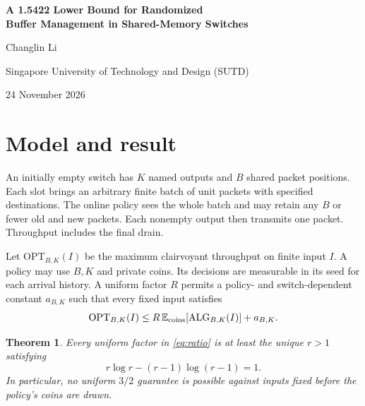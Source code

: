 \documentclass[11pt,letterpaper]{article}
\newtheorem{theorem}{Theorem}
\newcommand{\OPT}{\mathrm{OPT}}
\newcommand{\E}{\mathbb{E}}
\newcommand{\ALG}{\mathrm{ALG}}
\begin{document}
\begin{center}
{\LARGE\bfseries A 1.5422 Lower Bound for Randomized\\[3pt] Buffer Management in Shared-Memory Switches}\par
\vspace{0.6em}
{\large Changlin Li}\par
{\small Singapore University of Technology and Design (SUTD)}\par
{\small 24 November 2026}
\end{center}

\begin{abstract}
A shared-memory switch transmits one unit packet from each nonempty output queue per slot. We prove that every causal admission and eviction policy has uniform competitive ratio at least $1.5422114197\ldots$, even with private randomization against an oblivious adversary. The bound is the unique root $r>1$ of $r\log r-(r-1)\log(r-1)=1$. All queues start receiving together. A hidden permutation assigns their last arrival times. A capacity inequality accounts for the stock in queues about to stop receiving and in those already draining. Geometrically spaced groups approach the bound, and one explicit finite switch forces a ratio above $3/2$.
\end{abstract}

\section{Model and result}
An initially empty switch has $K$ named outputs and $B$ shared packet positions. Each slot brings an arbitrary finite batch of unit packets with specified destinations. The online policy sees the whole batch and may retain any $B$ or fewer old and new packets. Each nonempty output then transmits one packet. Throughput includes the final drain.

Let $\OPT_{B,K}(I)$ be the maximum clairvoyant throughput on finite input $I$. A policy may use $B,K$ and private coins. Its decisions are measurable in its seed for each arrival history. A uniform factor $R$ permits a policy- and switch-dependent constant $a_{B,K}$ such that every fixed input satisfies
\begin{equation}
  \OPT_{B,K}(I)\le R\,\E_{\rm coins}[\ALG_{B,K}(I)]+a_{B,K}.\label{eq:ratio}
\end{equation}
\begin{theorem}\label{thm:main}
Every uniform factor in \eqref{eq:ratio} is at least the unique $r>1$ satisfying
\[
       r\log r-(r-1)\log(r-1)=1.
\]
In particular, no uniform $3/2$ guarantee is possible against inputs fixed before the policy's coins are drawn.
\end{theorem}
\end{document}
